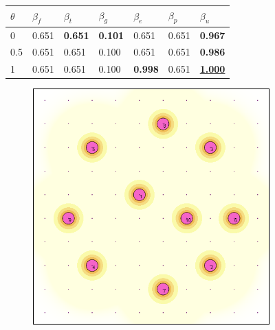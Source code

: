 \documentclass[letterpaper, 10 pt, conference]{ieeeconf}
\begin{document}
\begin{figure}[!h]
\begin{minipage}{\columnwidth}
{\begin{tabular}{|lllllll|}
\multicolumn{1}{|l|}{\textbf{$\theta$}} & \multicolumn{1}{l|}{\textbf{$\beta_f$}} & \multicolumn{1}{l|}{\textbf{$\beta_t$}} & \multicolumn{1}{l|}{\textbf{$\beta_g$}} & \multicolumn{1}{l|}{\textbf{$\beta_e$}} & \multicolumn{1}{l|}{\textbf{$\beta_p$}} & \textbf{$\beta_u$} \\ \hline
\multicolumn{1}{|l|}{0} & \multicolumn{1}{l|}{0.651} & \multicolumn{1}{l|}{\textbf{0.651}} & \multicolumn{1}{l|}{\textbf{0.101}} & \multicolumn{1}{l|}{0.651} & \multicolumn{1}{l|}{0.651} & \textbf{0.967} \\ \hline
\multicolumn{1}{|l|}{0.5} & \multicolumn{1}{l|}{0.651} & \multicolumn{1}{l|}{0.651} & \multicolumn{1}{l|}{0.100} & \multicolumn{1}{l|}{0.651} & \multicolumn{1}{l|}{0.651} & \textbf{0.986} \\ \hline
\multicolumn{1}{|l|}{1} & \multicolumn{1}{l|}{0.651} & \multicolumn{1}{l|}{0.651} & \multicolumn{1}{l|}{0.100} & \multicolumn{1}{l|}{\textbf{0.998}} & \multicolumn{1}{l|}{0.651} & {\ul \textbf{1.000}} \\ \hline
\end{tabular}%
}
\vspace{3mm}
\end{minipage}
\centering
\begin{subfigure}[t]{0.3\columnwidth}
    \centering
    \includegraphics[width=\columnwidth]{Figures/BlankDecay05.png}

\end{subfigure}
\end{figure}
\end{document}
